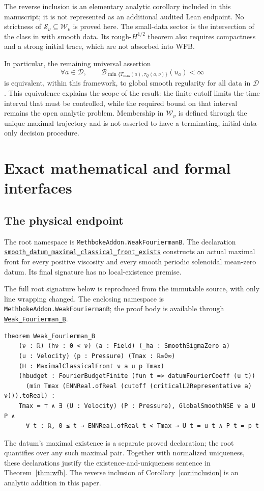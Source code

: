 \documentclass[11pt,a4paper]{article}
\numberwithin{equation}{section}
\theoremstyle{plain}
\theoremstyle{definition}
\theoremstyle{remark}
\newcommand{\D}{\mathcal D}
\newcommand{\Tmax}{T_{\max}}
\newcommand{\tq}{\tau_Q}
\newcommand{\Budget}{\mathcal B}
\newcommand{\decl}[1]{\begingroup\small\nolinkurl{#1}\endgroup}
\newcommand{\anchor}[3]{\href{https://github.com/randogelist/Methboke/blob/fdb515d8bde35ec8021bbc26f360aca8dfa2855c/Material/MethbokeAddon/WeakFouriermanB/#1\#L#2}{\decl{#3}}}
\begin{document}
The reverse inclusion is an elementary analytic corollary included in
this manuscript; it is not represented as an additional audited Lean
endpoint. No strictness of
$\mathcal S_\nu\subseteq\mathcal W_\nu$ is proved here.
The small-data sector is the intersection of the class in \cite{small}
with smooth data. Its rough-$H^{1/2}$ theorem also requires compactness
and a strong initial trace, which are not absorbed into WFB.

In particular, the remaining universal assertion
\begin{equation}\label{eq:universal}
 \forall a\in\D,\qquad
 \Budget_{\min\{\Tmax(a),\tq(a,\nu)\}}(u_a)<\infty
\end{equation}
is equivalent, within this framework, to global smooth regularity for
all data in $\D$. This equivalence explains the scope of the result:
the finite cutoff limits the time interval that must be controlled,
while the required bound on that interval remains the open analytic
problem. Membership in $\mathcal W_\nu$ is defined through the unique
maximal trajectory and is not asserted to have a terminating,
initial-data-only decision procedure.


\appendix
\section{Exact mathematical and formal interfaces}\label{app:semantics}
\subsection{The physical endpoint}
The root namespace is
\decl{MethbokeAddon.WeakFouriermanB}.
The declaration \anchor{WeakFouriermanB.lean}{36}{smooth_datum_maximal_classical_front_exists}
constructs an actual maximal front for every positive viscosity and every
smooth periodic solenoidal mean-zero datum. Its final signature has no
local-existence premise.

The full root signature below is reproduced from the immutable source,
with only line wrapping changed. The enclosing namespace is
\decl{MethbokeAddon.WeakFouriermanB}; the proof body is available through
\anchor{WeakFouriermanB.lean}{53}{Weak_Fourierman_B}.
\begin{lstlisting}[style=leanstatement]
theorem Weak_Fourierman_B
    (ν : ℝ) (hν : 0 < ν) (a : Field) (_ha : SmoothSigmaZero a)
    (u : Velocity) (p : Pressure) (Tmax : ℝ≥0∞)
    (H : MaximalClassicalFront ν a u p Tmax)
    (hbudget : FourierBudgetFinite (fun t => datumFourierCoeff (u t))
      (min Tmax (ENNReal.ofReal (cutoff (criticalL2Representative a) ν))).toReal) :
    Tmax = ⊤ ∧ ∃ (U : Velocity) (P : Pressure), GlobalSmoothNSE ν a U P ∧
      ∀ t : ℝ, 0 ≤ t → ENNReal.ofReal t < Tmax → U t = u t ∧ P t = p t
\end{lstlisting}
The datum's maximal existence is a separate proved declaration; the root
quantifies over any such maximal pair. Together with normalized
uniqueness, these declarations justify the existence-and-uniqueness
sentence in Theorem~\ref{thm:wfb}. The reverse inclusion of
Corollary~\ref{cor:inclusion} is an analytic addition in this paper.
\end{document}
